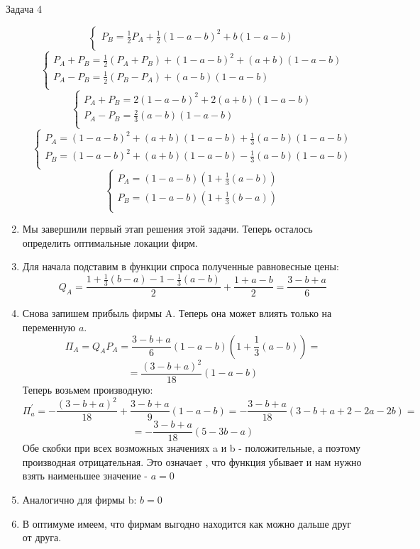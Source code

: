 \begin{mybox}{Задача 4}
\begin{enumerate}
$$\begin{cases}
            P_B=\frac{1}{2}P_A+\frac{1}{2}(1-a-b)^2+b(1-a-b) \\
        \end{cases}$$
    $$\begin{cases}
            P_A+P_B=\frac{1}{2}(P_A+P_B)+(1-a-b)^2+(a+b)(1-a-b) \\
            P_A-P_B=\frac{1}{2}(P_B-P_A)+(a-b)(1-a-b) \\
        \end{cases}$$
    $$\begin{cases}
            P_A+P_B=2(1-a-b)^2+2(a+b)(1-a-b) \\
            P_A-P_B=\frac{2}{3}(a-b)(1-a-b) \\
        \end{cases}$$
    $$\begin{cases}
            P_A=(1-a-b)^2+(a+b)(1-a-b)+\frac{1}{3}(a-b)(1-a-b) \\
            P_B=(1-a-b)^2+(a+b)(1-a-b)-\frac{1}{3}(a-b)(1-a-b) \\
        \end{cases}$$ $$\begin{cases}
            P_A=(1-a-b)(1+\frac{1}{3}(a-b)) \\
            P_B=(1-a-b)(1+\frac{1}{3}(b-a)) \\
        \end{cases}$$
    \item Мы завершили первый этап решения этой задачи. Теперь осталось определить оптимальные локации фирм.
    \item Для начала подставим в функции спроса полученные равновесные цены: $$Q_A=\frac{1+\frac{1}{3}(b-a)-1-\frac{1
    }{3}(a-b)}{2}+\frac{1+a-b}{2}=\frac{3-b+a}{6}$$
    \item Снова запишем прибыль фирмы A. Теперь она может влиять только на переменную $a$. $$\Pi_A=Q_AP_A=\frac{3-b
    +a}{6}(1-a-b)(1+\frac{1}{3}(a-b))=$$
    $$=\frac{(3-b+a)^2}{18}(1-a-b)$$
    Теперь возьмем производную:
    $$\Pi_a^{'}=-\frac{(3-b+a)^2}{18}+\frac{3-b+a}{9}(1-a-b)=-\frac{3-b+a}{18}(3-b+a+2-2a-2b)=$$
    $$=-\frac{3-b+a}{18}(5-3b-a)$$
    Обе скобки при всех возможных значениях a и b - положительные, а поэтому производная отрицательная. Это означает
    , что функция убывает и нам нужно взять наименьшее значение - $a=0$
    \item Аналогично для фирмы b: $b=0$
    \item В оптимуме имеем, что фирмам выгодно находится как можно дальше друг от друга.
\end{enumerate}
\end{mybox}

